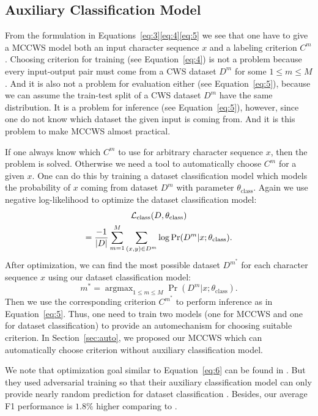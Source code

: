 \documentclass[11pt]{article}
\newcommand{\loss}{\mathcal{L}}
\newcommand{\opClass}{\operatorname{class}}
\newcommand{\thetaC}{\theta_{\opClass}}
\DeclareMathOperator*{\argmax}{\arg\max}
\DeclarePairedDelimiter{\abs}{\lvert}{\rvert}
\begin{document}
\subsection{Auxiliary Classification Model}\label{sec:class}

From the formulation in Equations~\eqref{eq:3}\eqref{eq:4}\eqref{eq:5} we see that one have to give a MCCWS model both an input character sequence \(x\) and a labeling criterion \(C^m\).
Choosing criterion for training (see Equation~\eqref{eq:4}) is not a problem because every input-output pair must come from a CWS dataset \(D^m\) for some \(1 \leq m \leq M\).
And it is also not a problem for evaluation either (see Equation~\eqref{eq:5}), because we can assume the train-test split of a CWS dataset \(D^m\) have the same distribution.
It is a problem for inference (see Equation~\eqref{eq:5}), however, since one do not know which dataset the given input is coming from.
And it is this problem to make MCCWS almost practical.

If one always know which \(C^m\) to use for arbitrary character sequence \(x\), then the problem is solved.
Otherwise we need a tool to automatically choose \(C^m\) for a given \(x\).
One can do this by training a dataset classification model which models the probability of \(x\) coming from dataset \(D^m\) with parameter \(\thetaC\).
Again we use negative log-likelihood to optimize the dataset classification model:
\begin{multline}\label{eq:6}
  \loss_{\opClass}(D, \thetaC) \\
  = \dfrac{-1}{\abs{D}} \sum_{m = 1}^M \sum_{(x, y) \in D^m} \log \Pr(D^m | x ; \thetaC).
\end{multline}
After optimization, we can find the most possible dataset \(D^{m^*}\) for each character sequence \(x\) using our dataset classification model:
\begin{equation}\label{eq:7}
  m^* = \argmax_{1 \leq m \leq M} \Pr(D^m | x ; \thetaC).
\end{equation}
Then we use the corresponding criterion \(C^{m^*}\) to perform inference as in Equation~\eqref{eq:5}.
Thus, one need to train two models (one for MCCWS and one for dataset classification) to provide an automechanism for choosing suitable criterion.
In Section~\ref{sec:auto}, we proposed our MCCWS which can automatically choose criterion without auxiliary classification model.

We note that optimization goal similar to Equation~\eqref{eq:6} can be found in \cite{chen-etal-2017-adversarial}.
But they used adversarial training so that their auxiliary classification model can only provide nearly random prediction for dataset classification \cite{goodfellow-2014-gan}.
Besides, our average F1 performance is \(1.8\%\) higher comparing to \cite{chen-etal-2017-adversarial}.
\end{document}
